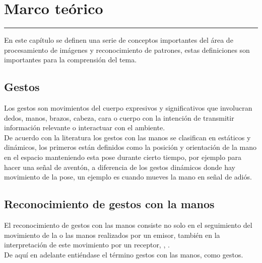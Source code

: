 \chapter{Marco te\'orico}\label{capit:cap2}
\vspace{-2.0325ex}%
\noindent
\rule{\textwidth}{0.5pt}
\vspace{-5.5ex}%
\newcommand{\pushline}{\Indp}%

En este capítulo se definen una serie de conceptos importantes del área de procesamiento de imágenes y reconocimiento de patrones, estas definiciones son importantes para la comprensión del tema.




\section{Gestos}\label{sec:2Gestos}
Los gestos \citep{Mitra2007} son movimientos del cuerpo expresivos y significativos que involucran dedos, manos, brazos, cabeza, cara o cuerpo con la intención de transmitir información relevante o interactuar con el ambiente. \\
De acuerdo con la literatura \citep{Mitra2007} los gestos con las manos se clasifican en estáticos y dinámicos, los primeros están definidos como la posición y orientación de la mano en el espacio manteniendo esta pose durante cierto tiempo, por ejemplo para hacer una se\~nal de aventón, a diferencia de los gestos dinámicos donde hay movimiento de la pose, un ejemplo  es cuando mueves la mano en se\~nal de adiós. 



\section{Reconocimiento de gestos con la manos}\label{sec:2ReconocimientoGestos}   

El reconocimiento de gestos con las manos consiste no solo en el seguimiento del movimiento de la o las manos realizados por un emisor, también en la interpretación de este movimiento por un receptor, \citep{Mitra2007}, \citep{Murthy2009}.\\
De aquí en adelante entiéndase el término gestos con las manos, como gestos.   


